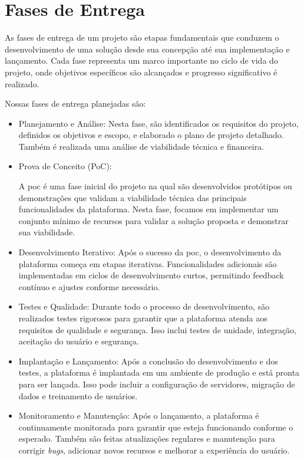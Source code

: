 \section{Fases de Entrega}

As fases de entrega de um projeto são etapas fundamentais que conduzem o desenvolvimento de uma solução desde sua concepção até sua implementação e lançamento. Cada fase representa um marco importante no ciclo de vida do projeto, onde objetivos específicos são alcançados e progresso significativo é realizado.

Nossas fases de entrega planejadas são:

\begin{itemize}
\item Planejamento e Análise:
Nesta fase, são identificados os requisitos do projeto, definidos os objetivos e escopo, e elaborado o plano de projeto detalhado. Também é realizada uma análise de viabilidade técnica e financeira.

\item Prova de Conceito (PoC):

A \ac{poc} é uma fase inicial do projeto na qual são desenvolvidos protótipos ou demonstrações que validam a viabilidade técnica das principais funcionalidades da plataforma. Nesta fase, focamos em implementar um conjunto mínimo de recursos para validar a solução proposta e demonstrar sua viabilidade.

\item Desenvolvimento Iterativo:
Após o sucesso da \acs{poc}, o desenvolvimento da plataforma começa em etapas iterativas. Funcionalidades adicionais são implementadas em ciclos de desenvolvimento curtos, permitindo feedback contínuo e ajustes conforme necessário.

\item Testes e Qualidade:
Durante todo o processo de desenvolvimento, são realizados testes rigorosos para garantir que a plataforma atenda aos requisitos de qualidade e segurança. Isso inclui testes de unidade, integração, aceitação do usuário e segurança.

\item Implantação e Lançamento:
Após a conclusão do desenvolvimento e dos testes, a plataforma é implantada em um ambiente de produção e está pronta para ser lançada. Isso pode incluir a configuração de servidores, migração de dados e treinamento de usuários.

\item Monitoramento e Manutenção:
Após o lançamento, a plataforma é continuamente monitorada para garantir que esteja funcionando conforme o esperado. Também são feitas atualizações regulares e manutenção para corrigir \textit{bugs}, adicionar novos recursos e melhorar a experiência do usuário.

\end{itemize}


